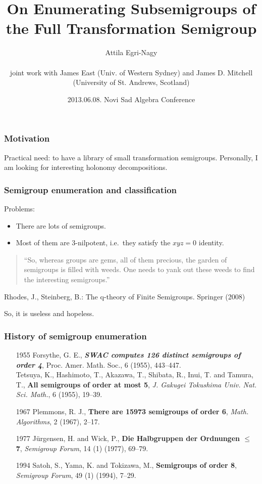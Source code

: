 \documentclass{beamer}
\newcommand{\jump}{\vskip6pt}
\begin{document}
\title[Subsemigroup Enumeration]{On Enumerating Subsemigroups of the Full Transformation Semigroup }
\author[e-n@]{Attila Egri-Nagy\\\ \\joint work with James East (Univ. of Western Sydney) and James D. Mitchell (University of St. Andrews, Scotland)}
\date[NSAC 2013]{2013.06.08. Novi Sad Algebra Conference}

\begin{frame}
\titlepage
\end{frame}

\begin{frame}\frametitle{Motivation}
Practical need: to have a library of small transformation semigroups.
\jump\jump
Personally, I am looking for interesting holonomy decompositions. 
\end{frame}

\begin{frame}\frametitle{Semigroup enumeration and classification}
Problems:
\begin{itemize}
\item There are lots of semigroups.
\item Most of them are 3-nilpotent, i.e.\ they satisfy the $xyz=0$ identity.
\end{itemize}
\jump

\begin{quote}
``So, whereas groups are
gems, all of them precious, the garden of semigroups is filled with weeds. One
needs to yank out these weeds to find the interesting semigroups.''
\end{quote}
Rhodes, J., Steinberg, B.: The q-theory of Finite Semigroups. Springer (2008)

\jump
\jump

So, it is useless and hopeless. 
\end{frame}

\begin{frame}\frametitle{History of semigroup enumeration}
\begin{enumerate}
\item[1955] Forsythe, G. E., \textbf{\emph{SWAC computes 126 distinct semigroups of order 4}}, Proc. Amer. Math. Soc., 6 (1955), 443--447.
\\\vskip6pt
Tetsuya, K., Hashimoto, T., Akazawa, T., Shibata, R., Inui, T. and Tamura, T., \textbf{{All semigroups of order at most 5}}, \emph{J. Gakugei Tokushima Univ. Nat. Sci. Math.}, 6 (1955), 19--39.
\item[1967] Plemmons, R. J., \textbf{There are 15973 semigroups of order 6}, \emph{Math. Algorithms}, 2 (1967), 2--17. 
\item[1977]J\"urgensen, H. and Wick, P., \textbf{Die Halbgruppen der Ordnungen  $\mathbf{\leq}$ 7}, \emph{Semigroup Forum}, 14 (1) (1977), 69--79.
\item[1994]Satoh, S., Yama, K. and Tokizawa, M., \textbf{Semigroups of order 8}, \emph{Semigroup Forum}, 49 (1) (1994), 7--29.  
\end{enumerate}
\end{frame}
\end{document}
